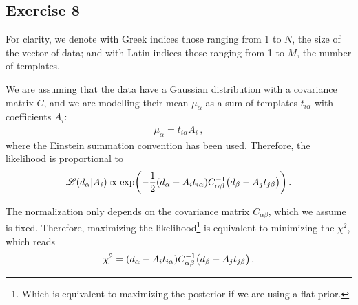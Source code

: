 \documentclass[main.tex]{subfiles}
\begin{document}
\subsection{Exercise 8}

For clarity, we denote with Greek indices those ranging from 1 to \(N\), the size of the vector of data; and with Latin indices those ranging from 1 to \(M\), the number of templates.

We are assuming that the data have a Gaussian distribution with a covariance matrix \(C\), and we are modelling their mean \(\mu_\alpha  \) as a sum of templates \(t_{i \alpha}\) with coefficients \(A_i\):
%
\begin{align}
\mu _\alpha = t_{i \alpha } A_i
\,,
\end{align}
%
where the Einstein summation convention has been used. 
Therefore, the likelihood is proportional to 
%
\begin{align}
\mathscr{L}(d_\alpha | A_i) \propto \exp(- \frac{1}{2} \qty(d_\alpha - A_{i} t_{i \alpha }) C^{-1}_{\alpha \beta } 
\qty(d_\beta - A_j t_{j \beta }))
\,.
\end{align}

The normalization only depends on the covariance matrix \(C_{\alpha \beta }\), which we assume is fixed.
Therefore, maximizing the likelihood\footnote{Which is equivalent to maximizing the posterior if we are using a flat prior.} is equivalent to minimizing the \(\chi^2\), which reads 
%
\begin{align}
\chi^2 = \qty(d_\alpha - A_{i} t_{i \alpha }) C^{-1}_{\alpha \beta } 
\qty(d_\beta - A_j t_{j \beta })
\,.
\end{align}
\end{document}
